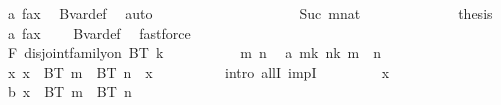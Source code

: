 \begin{isabellebody}
\ a\ fax{}\ \isamarkupfalse%
\ Bvar{\isacharunderscore}{\kern0pt}def\ \isamarkupfalse%
\ auto\isanewline
\ \ \ \ \ \ \ \ \isamarkupfalse%
\isanewline
\ \ \ \ \ \ \ \ \ \ \isamarkupfalse%
\ {\isacharparenleft}{\kern0pt}Suc\ mnat{\isacharparenright}{\kern0pt}\isanewline
\ \ \ \ \ \ \ \ \ \ \isamarkupfalse%
\ \isamarkupfalse%
\ {\isacharquery}{\kern0pt}thesis\ \isamarkupfalse%
\ a\ fax{}\ \ {\isacharasterisk}{\kern0pt}\ \isamarkupfalse%
\ Bvar{\isacharunderscore}{\kern0pt}def\ \isamarkupfalse%
\ fastforce\isanewline
\ \ \ \ \ \ \ \ \isamarkupfalse%
\isanewline
\ \ \ \ \ \ \isamarkupfalse%
\isanewline
\ \ \ \isamarkupfalse%
\isanewline
\isanewline
\ \ \ \isamarkupfalse%
\ F{}{\isacharcolon}{\kern0pt}\ {\isachardoublequoteopen}disjoint{\isacharunderscore}{\kern0pt}family{\isacharunderscore}{\kern0pt}on\ BT\ {\isacharbraceleft}{\kern0pt}{\isachardot}{\kern0pt}{\isachardot}{\kern0pt}k{\isacharplus}{\kern0pt}{}{\isacharbraceright}{\kern0pt}{\isachardoublequoteclose}\isanewline
\ \ \ \isamarkupfalse%
\isanewline
\ \ \ \ \ \isamarkupfalse%
\ m\ n\ \isamarkupfalse%
\ a{\isacharcolon}{\kern0pt}\ {\isachardoublequoteopen}m{\isasymin}{\isacharbraceleft}{\kern0pt}{\isachardot}{\kern0pt}{\isachardot}{\kern0pt}k{\isacharplus}{\kern0pt}{}{\isacharbraceright}{\kern0pt}{\isachardoublequoteclose}\ {\isachardoublequoteopen}n{\isasymin}{\isacharbraceleft}{\kern0pt}{\isachardot}{\kern0pt}{\isachardot}{\kern0pt}k{\isacharplus}{\kern0pt}{}{\isacharbraceright}{\kern0pt}{\isachardoublequoteclose}\ {\isachardoublequoteopen}m\ {\isasymnoteq}\ n{\isachardoublequoteclose}\isanewline
\ \ \ \ \ \isamarkupfalse%
\ {\isachardoublequoteopen}{\isasymforall}x{\isachardot}{\kern0pt}\ x\ {\isasymin}\ BT\ m\ {\isasyminter}\ BT\ n\ {\isasymlongrightarrow}\ x\ {\isasymin}\ {\isacharbraceleft}{\kern0pt}{\isacharbraceright}{\kern0pt}{\isachardoublequoteclose}\ \isanewline
\ \ \ \ \ \isamarkupfalse%
\ {\isacharparenleft}{\kern0pt}intro\ allI\ impI{\isacharparenright}{\kern0pt}\isanewline
\ \ \ \ \ \ \ \isamarkupfalse%
\ x\ \isamarkupfalse%
\ b{\isacharcolon}{\kern0pt}\ {\isachardoublequoteopen}x\ {\isasymin}\ BT\ m\ {\isasyminter}\ BT\ n{\isachardoublequoteclose}\isanewline
\ \ \ \ \ \ \ \isamarkupfalse%

\end{isabellebody}
